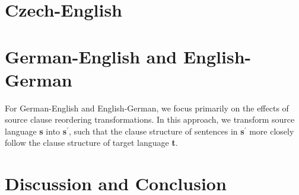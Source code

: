 \documentclass[11pt,a4paper]{article}
\begin{document}
\section{Czech-English}
\label{csen}






\section{German-English and English-German}
\label{deen}

For German-English and English-German, we focus primarily on the effects of source clause reordering transformations.
%
In this approach, we transform source language \textbf{s} into \textbf{s}$^\prime$, such that the clause structure of sentences in \textbf{s}$^\prime$ more closely follow the clause structure of target language \textbf{t}.







\section{Discussion and Conclusion}

%
\end{document}
